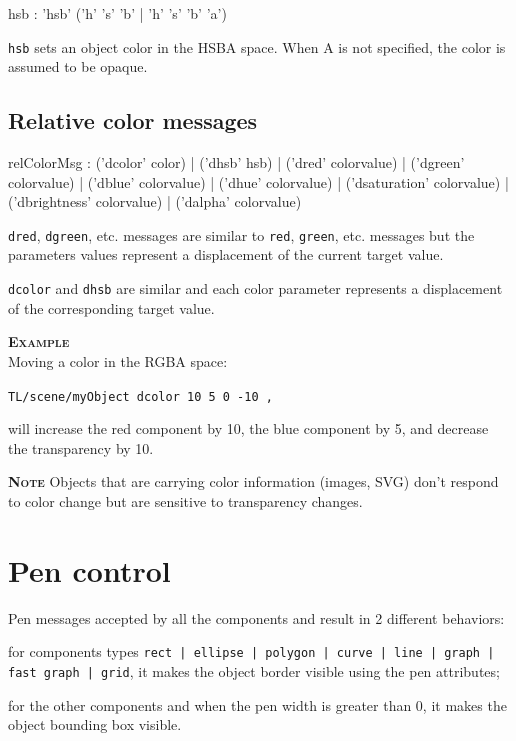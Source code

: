\documentclass[a4paper,twoside]{report}
\newcommand{\sublevel}[1]	{\section{#1}}
\newcommand{\subsublevel}[1]	{\subsection{#1}}
\newcommand{\OSC}[1]		{\texttt{#1}}
\newcommand{\example}		{\textbf{\hspace{-1.5cm}\textbf{\textsc{Example }}}}
\newcommand{\note}	[1]		{\vspace{2mm}\textbf{\hspace{-1.03cm}\textbf{\textsc{Note #1}}}}
\let\olditemize\itemize
\let\oldenditemize\enditemize
\renewenvironment{itemize} 	{\olditemize \setlength{\itemsep}{1mm}}{\oldenditemize}
\newcommand{\sample}	[1]			{\vspace{-2mm}\begin{center}\colorbox{mygrey}{
								\begin{minipage}[t]{0.9\columnwidth} 
								{\small \texttt{#1}}
								\end{minipage}}\end{center}}
\newcommand{\sampleindent}	{ \hspace{0.5cm} }
\begin{document}
\begin{rail}
hsb :		'hsb' ('h' 's' 'b' | 'h' 's' 'b' 'a') 
\end{rail}

\OSC{hsb} sets an object color in the HSBA space. 
When A is not specified, the color is assumed to be opaque. 



\subsublevel{Relative color messages}
\label{relcolormsg}

\begin{rail}
relColorMsg :  
		 	('dcolor' color) 
		| 	('dhsb' hsb) 
		| 	('dred' colorvalue) 
		| 	('dgreen' colorvalue) 
		| 	('dblue' colorvalue) 
		| 	('dhue' colorvalue) 
		| 	('dsaturation' colorvalue) 
		| 	('dbrightness' colorvalue) 
		| 	('dalpha' colorvalue) 
\end{rail}

\begin{itemize}
\item \OSC{dred}, \OSC{dgreen}, etc. messages are similar to \OSC{red}, \OSC{green}, etc. messages but the parameters values represent a displacement of the current target value.
\item \OSC{dcolor} and \OSC{dhsb} are similar and each color parameter represents a displacement of the corresponding target value.
\end{itemize}

\example \\
Moving a color in the RGBA space:
\sample{TL/scene/myObject dcolor 10 5 0 -10 ,}
\sampleindent will increase the red component by 10, the blue component by 5, and decrease the transparency by 10.

\note{} Objects that are carrying color information (images, SVG) don't respond to color change but are sensitive to transparency changes.


\sublevel{Pen control}

Pen messages accepted by all the components and result in 2 different behaviors:
\begin{itemize}
\item for components types \OSC{rect | ellipse | polygon | curve | line | graph | fast graph | grid}, it makes the object border visible using the pen attributes;
\item for the other components and when the pen width is greater than 0, it makes the object bounding box visible.
\end{itemize}
\end{document}
